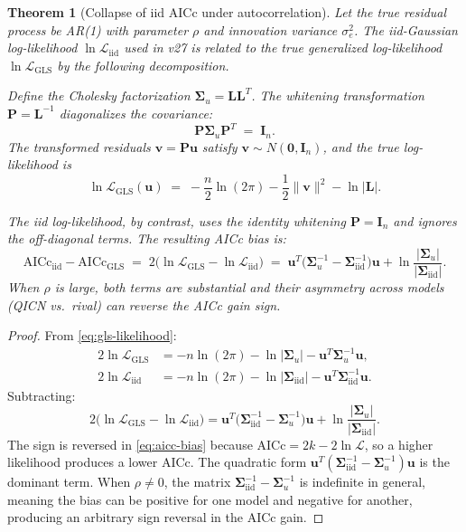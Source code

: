 \documentclass[11pt]{article}
\newtheorem{theorem}{Theorem}
\begin{document}
\begin{theorem}[Collapse of iid AICc under autocorrelation]\label{thm:aicc-collapse}
Let the true residual process be AR(1) with parameter $\rho$ and innovation variance $\sigma_e^2$. The iid-Gaussian log-likelihood $\ln\mathcal{L}_{\mathrm{iid}}$ used in v27 is related to the true generalized log-likelihood $\ln\mathcal{L}_{\mathrm{GLS}}$ by the following decomposition.

Define the Cholesky factorization $\bm{\Sigma}_u=\bm{L}\bm{L}^T$. The \emph{whitening transformation} $\bm{P}=\bm{L}^{-1}$ diagonalizes the covariance:
\[
\bm{P}\bm{\Sigma}_u\bm{P}^T\;=\;\bm{I}_n.
\]
The transformed residuals $\bm{v}=\bm{P}\bm{u}$ satisfy $\bm{v}\sim N(\bm{0},\bm{I}_n)$, and the true log-likelihood is
\[
\ln\mathcal{L}_{\mathrm{GLS}}(\bm{u})\;=\;-\frac{n}{2}\ln(2\pi)-\frac{1}{2}\|\bm{v}\|^2-\ln|\bm{L}|.
\]

The iid log-likelihood, by contrast, uses the identity whitening $\bm{P}=\bm{I}_n$ and ignores the off-diagonal terms. The resulting AICc bias is:
\begin{equation}\label{eq:aicc-bias}
\mathrm{AICc}_{\mathrm{iid}}-\mathrm{AICc}_{\mathrm{GLS}}\;=\;2\bigl(\ln\mathcal{L}_{\mathrm{GLS}}-\ln\mathcal{L}_{\mathrm{iid}}\bigr)
\;=\;\bm{u}^T\!\bigl(\bm{\Sigma}_u^{-1}-\bm{\Sigma}_{\mathrm{iid}}^{-1}\bigr)\bm{u}+\ln\frac{|\bm{\Sigma}_u|}{|\bm{\Sigma}_{\mathrm{iid}}|}.
\end{equation}
When $\rho$ is large, both terms are substantial and their asymmetry across models (QICN vs.\ rival) can reverse the AICc gain sign.
\end{theorem}

\begin{proof}
From \eqref{eq:gls-likelihood}:
\begin{align*}
2\ln\mathcal{L}_{\mathrm{GLS}}&=-n\ln(2\pi)-\ln|\bm{\Sigma}_u|-\bm{u}^T\bm{\Sigma}_u^{-1}\bm{u},\\
2\ln\mathcal{L}_{\mathrm{iid}}&=-n\ln(2\pi)-\ln|\bm{\Sigma}_{\mathrm{iid}}|-\bm{u}^T\bm{\Sigma}_{\mathrm{iid}}^{-1}\bm{u}.
\end{align*}
Subtracting:
\[
2\bigl(\ln\mathcal{L}_{\mathrm{GLS}}-\ln\mathcal{L}_{\mathrm{iid}}\bigr)
=\bm{u}^T\!\bigl(\bm{\Sigma}_{\mathrm{iid}}^{-1}-\bm{\Sigma}_u^{-1}\bigr)\bm{u}
+\ln\frac{|\bm{\Sigma}_u|}{|\bm{\Sigma}_{\mathrm{iid}}|}.
\]
The sign is reversed in \eqref{eq:aicc-bias} because AICc$=2k-2\ln\mathcal{L}$, so a higher likelihood produces a lower AICc. The quadratic form $\bm{u}^T(\bm{\Sigma}_{\mathrm{iid}}^{-1}-\bm{\Sigma}_u^{-1})\bm{u}$ is the dominant term. When $\rho\neq 0$, the matrix $\bm{\Sigma}_{\mathrm{iid}}^{-1}-\bm{\Sigma}_u^{-1}$ is indefinite in general, meaning the bias can be positive for one model and negative for another, producing an arbitrary sign reversal in the AICc gain.
\end{proof}
\end{document}
